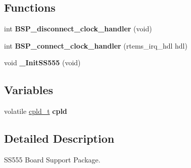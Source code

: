\subsection*{Functions}
\begin{DoxyCompactItemize}
\item 
\mbox{\label{group__RTEMSBSPsPowerPCSS555_ga5b6f7a1b73b76ef80251fd770905d0c1}} 
int {\bfseries B\+S\+P\+\_\+disconnect\+\_\+clock\+\_\+handler} (void)
\item 
\mbox{\label{group__RTEMSBSPsPowerPCSS555_gad938775572119032c07feabae43bf511}} 
int {\bfseries B\+S\+P\+\_\+connect\+\_\+clock\+\_\+handler} (rtems\+\_\+irq\+\_\+hdl hdl)
\item 
\mbox{\label{group__RTEMSBSPsPowerPCSS555_gaf08c5f9a8f608ed9238ace7c695f8dad}} 
void {\bfseries \+\_\+\+Init\+S\+S555} (void)
\end{DoxyCompactItemize}
\subsection*{Variables}
\begin{DoxyCompactItemize}
\item 
\mbox{\label{group__RTEMSBSPsPowerPCSS555_gaf77d8a3d303e062e7579cfaba783ba98}} 
volatile \mbox{\hyperlink{structcpld__}{cpld\+\_\+t}} {\bfseries cpld}
\end{DoxyCompactItemize}


\subsection{Detailed Description}
S\+S555 Board Support Package. 

